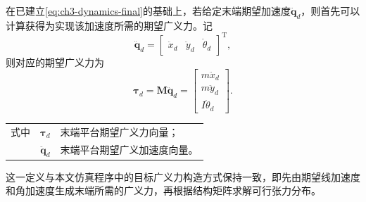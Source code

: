 在已建立\cref{eq:ch3-dynamics-final}的基础上，若给定末端期望加速度$\ddot{\bm q}_d$，则首先可以计算获得为实现该加速度所需的期望广义力。记
\begin{equation}
  \ddot{\bm q}_d= \begin{bmatrix} \ddot{x}_d & \ddot{y}_d & \ddot{\theta}_d \end{bmatrix}^{\mathrm T},
\end{equation}
则对应的期望广义力为
\begin{equation}
  \bm \tau_d=\bm M\ddot{\bm q}_d
  =
  \begin{bmatrix}
    m\ddot{x}_d \\
    m\ddot{y}_d \\
    I\ddot{\theta}_d
  \end{bmatrix}.
  \label{eq:ch3-target-wrench}
\end{equation}
\begin{tabularx}{\textwidth}{@{}l@{\quad}r@{———}X@{}}
  式中 & $\bm \tau_d$ & 末端平台期望广义力向量；\\
       & $\ddot{\bm q}_d$ & 末端平台期望广义加速度向量。
\end{tabularx}
这一定义与本文仿真程序中的目标广义力构造方式保持一致，即先由期望线加速度和角加速度生成末端所需的广义力，再根据结构矩阵求解可行张力分布。

